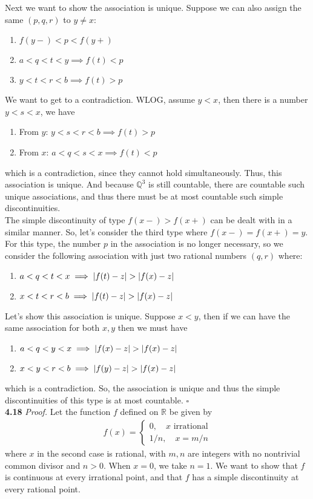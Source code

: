 \documentclass[11pt]{article}
\begin{document}
Next we want to show the association is unique. Suppose we can also assign the same $(p,q,r)$ to $y\neq x$:
\begin{enumerate}
	\item $f(y-) < p < f(y+)$
	\item $a < q < t < y \implies f(t) < p$
	\item $y < t < r < b \implies f(t) > p$
\end{enumerate}
We want to get to a contradiction. WLOG, assume $y < x$, then there is a number $y < s < x$, we have 
\begin{enumerate}
	\item From $y$: $y < s < r < b \implies f(t) > p$
	\item From $x$:  $a < q < s < x \implies f(t) < p$
\end{enumerate}
which is a contradiction, since they cannot hold simultaneously. Thus, this association is unique. And because $\mathbb{Q}^3$ is still countable, there are countable such unique associations, and thus there  must be at most countable such simple discontinuities. \\

The simple discontinuity of type $f(x-) > f(x+)$ can be dealt with in a similar manner. So, let's consider the third type where $f(x-) = f(x+) = y$. For this type, the number $p$ in the association is no longer necessary, so we consider the following association with just two rational numbers $(q,r)$ where:
\begin{enumerate}
	\item $a < q < t < x \implies \abs{f(t) - z} > \abs{f(x) - z}$
	\item $x < t < r < b \implies \abs{f(t) - z} > \abs{f(x) - z}$
\end{enumerate}
Let's show this association is unique. Suppose $x < y$, then if we can have the same association for both $x,y$ then we must have
\begin{enumerate}
	\item $a < q < y < x \implies \abs{f(x) - z} > \abs{f(x) - z}$
	\item $x < y < r < b \implies \abs{f(y) - z} > \abs{f(x) - z}$
\end{enumerate}
which is a contradiction. So, the association is unique and thus the simple discontinuities of this type is at most countable.  \hfill $\square$\\




\noindent \textbf{4.18}
\noindent \textit{Proof.} Let the function $f$ defined on $\mathbb{R}$ be given by
\begin{align*}
f(x) = \begin{cases}
0, \quad x \text{ irrational}\\
1/n, \quad x = m/n
\end{cases}
\end{align*}
where $x$ in the second case is rational, with $m,n$ are integers with no nontrivial common divisor and $n > 0$. When $x = 0$, we take $n=1$. We want to show that $f$ is continuous at every irrational point, and that $f$ has a simple discontinuity at every rational point. \\
\end{document}

